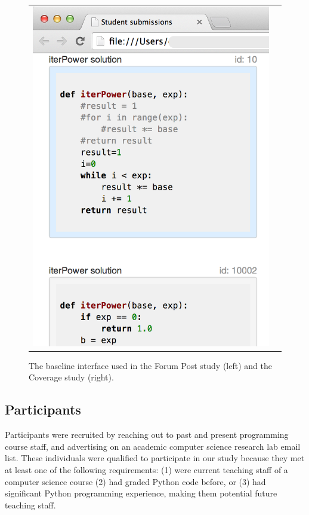 \begin{figure}[h!]
\begin{tabular}{cc}
\includegraphics[scale=0.37]{Body/figures/overcode/iterPowerEdXControlStudy2.png} \\
\end{tabular}
\caption{The baseline interface used in the Forum Post study (left) and the Coverage study (right).}
\label{iterPowerEdXControl}
\end{figure}
\subsection{Participants}

Participants were recruited by reaching out to past and present programming course staff, and advertising on an academic computer science research lab email list. These individuals were qualified to participate in our study because they met at least one of the following requirements: (1) were current teaching staff of a computer science course (2) had graded Python code before, or (3) had significant Python programming experience, making them potential future teaching staff. 

